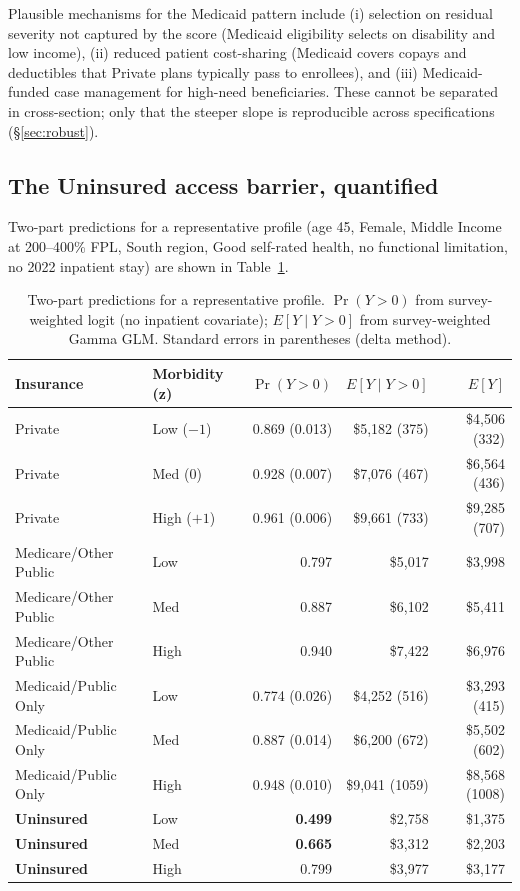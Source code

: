 \documentclass[11pt,a4paper]{article}
\begin{document}
Plausible mechanisms for the Medicaid pattern include (i) selection on residual severity not captured by the score (Medicaid eligibility selects on disability and low income), (ii) reduced patient cost-sharing (Medicaid covers copays and deductibles that Private plans typically pass to enrollees), and (iii) Medicaid-funded case management for high-need beneficiaries. These cannot be separated in cross-section; only that the steeper slope is reproducible across specifications (\S\ref{sec:robust}).

\subsection{The Uninsured access barrier, quantified}

Two-part predictions for a representative profile (age 45, Female, Middle Income at 200--400\% FPL, South region, Good self-rated health, no functional limitation, no 2022 inpatient stay) are shown in Table~\ref{tab:twopart}.

\begin{table}[H]
\centering
\caption{Two-part predictions for a representative profile. $\Pr(Y > 0)$ from survey-weighted logit (no inpatient covariate); $E[Y \mid Y > 0]$ from survey-weighted Gamma GLM. Standard errors in parentheses (delta method).}
\label{tab:twopart}
\small
\begin{tabular}{llrrr}
\toprule
\textbf{Insurance} & \textbf{Morbidity (z)} & $\Pr(Y > 0)$ & $E[Y \mid Y > 0]$ & $E[Y]$ \\
\midrule
Private               & Low ($-1$)  & 0.869 (0.013) & \$5{,}182 (375)  & \$4{,}506 (332)  \\
Private               & Med ($0$)   & 0.928 (0.007) & \$7{,}076 (467)  & \$6{,}564 (436)  \\
Private               & High ($+1$) & 0.961 (0.006) & \$9{,}661 (733)  & \$9{,}285 (707)  \\
\midrule
Medicare/Other Public & Low         & 0.797         & \$5{,}017        & \$3{,}998        \\
Medicare/Other Public & Med         & 0.887         & \$6{,}102        & \$5{,}411        \\
Medicare/Other Public & High        & 0.940         & \$7{,}422        & \$6{,}976        \\
\midrule
Medicaid/Public Only  & Low         & 0.774 (0.026) & \$4{,}252 (516)  & \$3{,}293 (415)  \\
Medicaid/Public Only  & Med         & 0.887 (0.014) & \$6{,}200 (672)  & \$5{,}502 (602)  \\
Medicaid/Public Only  & High        & 0.948 (0.010) & \$9{,}041 (1059) & \$8{,}568 (1008) \\
\midrule
\textbf{Uninsured}    & Low         & \textbf{0.499} & \$2{,}758       & \$1{,}375        \\
\textbf{Uninsured}    & Med         & \textbf{0.665} & \$3{,}312       & \$2{,}203        \\
\textbf{Uninsured}    & High        & 0.799          & \$3{,}977       & \$3{,}177        \\
\bottomrule
\end{tabular}
\end{table}
\end{document}
